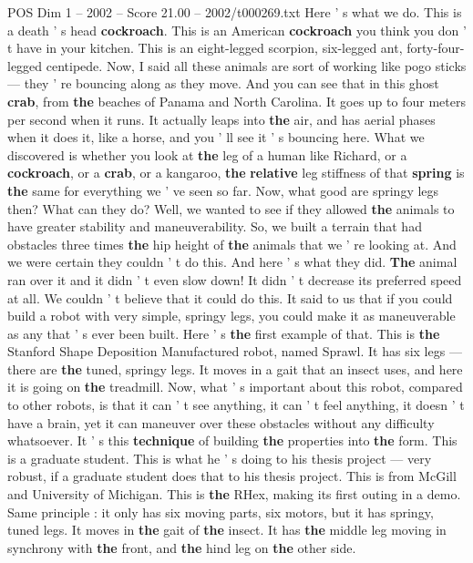 \begin{textsample}{POS Dim 1 – 2002 – Score 21.00 – 2002/t000269.txt}
Here ' s what we do.
This is a death ' s head \textbf{cockroach}.
This is an American \textbf{cockroach} you think you don ' t have in your kitchen.
This is an eight-legged scorpion, six-legged ant, forty-four-legged centipede.
Now, I said all these animals are sort of working like pogo sticks — they ' re bouncing along as they move.
And you can see that in this ghost \textbf{crab}, from \textbf{the} beaches of Panama and North Carolina.
It goes up to four meters per second when it runs.
It actually leaps into \textbf{the} air, and has aerial phases when it does it, like a horse, and you ' ll see it ' s bouncing here.
What we discovered is whether you look at \textbf{the} leg of a human like Richard, or a \textbf{cockroach}, or a \textbf{crab}, or a kangaroo, \textbf{the} \textbf{relative} leg stiffness of that \textbf{spring} is \textbf{the} same for everything we ' ve seen so far.
Now, what good are springy legs then?
What can they do?
Well, we wanted to see if they allowed \textbf{the} animals to have greater stability and maneuverability.
So, we built a terrain that had obstacles three times \textbf{the} hip height of \textbf{the} animals that we ' re looking at.
And we were certain they couldn ' t do this.
And here ' s what they did. \textbf{The} animal ran over it and it didn ' t even slow down!
It didn ' t decrease its preferred speed at all.
We couldn ' t believe that it could do this.
It said to us that if you could build a robot with very simple, springy legs, you could make it as maneuverable as any that ' s ever been built.
Here ' s \textbf{the} first example of that.
This is \textbf{the} Stanford Shape Deposition Manufactured robot, named Sprawl.
It has six legs — there are \textbf{the} tuned, springy legs.
It moves in a gait that an insect uses, and here it is going on \textbf{the} treadmill.
Now, what ' s important about this robot, compared to other robots, is that it can ' t see anything, it can ' t feel anything, it doesn ' t have a brain, yet it can maneuver over these obstacles without any difficulty whatsoever.
It ' s this \textbf{technique} of building \textbf{the} properties into \textbf{the} form.
This is a graduate student.
This is what he ' s doing to his thesis project — very robust, if a graduate student does that to his thesis project.
This is from McGill and University of Michigan.
This is \textbf{the} RHex, making its first outing in a demo.
Same principle : it only has six moving parts, six motors, but it has springy, tuned legs.
It moves in \textbf{the} gait of \textbf{the} insect.
It has \textbf{the} middle leg moving in synchrony with \textbf{the} front, and \textbf{the} hind leg on \textbf{the} other side.

\end{textsample}
